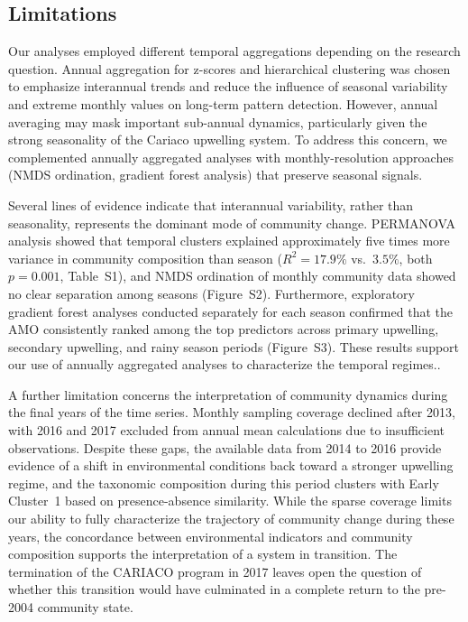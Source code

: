 \documentclass[]{agujournal2019}
\begin{document}
    

\subsection{Limitations}
     Our analyses employed different temporal aggregations depending on the research question. Annual aggregation for z-scores and hierarchical clustering was chosen to emphasize interannual trends and reduce the influence of seasonal variability and extreme monthly values on long-term pattern detection. However, annual averaging may mask important sub-annual dynamics, particularly given the strong seasonality of the Cariaco upwelling system. To address this concern, we complemented annually aggregated analyses with monthly-resolution approaches (NMDS ordination, gradient forest analysis) that preserve seasonal signals.

    Several lines of evidence indicate that interannual variability, rather than seasonality, represents the dominant mode of community change. PERMANOVA analysis showed that temporal clusters explained approximately five times more variance in community composition than season ($R^2 = 17.9\%$ vs.\ $3.5\%$, both $p = 0.001$, Table~S1), and NMDS ordination of monthly community data showed no clear separation among seasons (Figure~S2). Furthermore, exploratory gradient forest analyses conducted separately for each season confirmed that the AMO consistently ranked among the top predictors across primary upwelling, secondary upwelling, and rainy season periods (Figure~S3). These results support our use of annually aggregated analyses to characterize the temporal regimes..
    
    A further limitation concerns the interpretation of community dynamics during the final years of the time series. Monthly sampling coverage declined after 2013, with 2016 and 2017 excluded from annual mean calculations due to insufficient observations. Despite these gaps, the available data from 2014 to 2016 provide evidence of a shift in environmental conditions back toward a stronger upwelling regime, and the taxonomic composition during this period clusters with Early Cluster~1 based on presence-absence similarity. While the sparse coverage limits our ability to fully characterize the trajectory of community change during these years, the concordance between environmental indicators and community composition supports the interpretation of a system in transition. The termination of the CARIACO program in 2017 leaves open the question of whether this transition would have culminated in a complete return to the pre-2004 community state.
\end{document}
